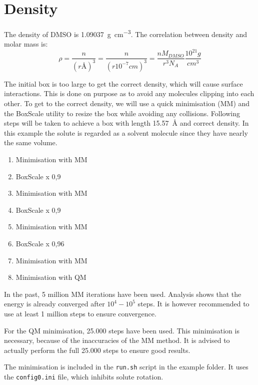 \documentclass[a4paper,fleqn]{report}
\begin{document}
	\section{Density}
	The density of DMSO is \SI{1,09037}{g cm^{-3}}.\cite{Radhamma2008}
	The correlation between density and molar mass is:
	\begin{equation}
	\rho = \dfrac{n}{(r \si{\angstrom})^3} = \dfrac{n}{(r \si{10^{-7} 
	cm})^3} = \dfrac{n M_{DMSO}}{r^3 N_A} \dfrac{10^{21} g}{cm^3}
	\end{equation}
	
	The initial box is too large to get the correct density, which will cause 
	surface interactions. This is done on purpose as to avoid any molecules 
	clipping into each other. To get to the correct density, we will use a 
	quick minimisation (MM) and the BoxScale utility to resize the box while 
	avoiding any collisions.
	Following steps will be taken to achieve a box with length 
	\SI{15,57}{\angstrom} and correct density. In this example the solute is 
	regarded as a solvent molecule since they have nearly the same volume.
	
	\begin{enumerate}
		\setlength{\itemsep}{-1pt}
		\setlength{\parsep}{-1pt}
		\item Minimisation with MM
		\item BoxScale x 0,9
		\item Minimisation with MM
		\item BoxScale x 0,9
		\item Minimisation with MM
		\item BoxScale x 0,96
		\item Minimisation with MM
		\item Minimisation with QM
	\end{enumerate}
	
	In the past, 5 million MM iterations have been used.
	Analysis shows that the energy is already converged after $10^4 - 10^5$ 
	steps.
	It is however recommended to use at least 1 million steps to ensure 
	convergence.
	
	For the QM minimisation, 25.000 steps have been used. This minimisation is 
	necessary, because of the inaccuracies of the MM method. It is advised to 
	actually perform the full 25.000 steps to ensure good results.
	
	The minimisation is included in the \verb|run.sh| script in the example 
	folder. It uses the \verb|config0.ini| file, which inhibits solute rotation.
	
\end{document}
